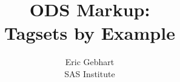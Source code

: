 \documentclass{book}
\begin{document}
\fancyhead{} %
\fancyhead[LO,RE]{\thepage}
\fancyhead[RO]{}
\fancyhead[LE]{}
\fancyfoot[CO,CE]{}

\frontmatter
\title{ODS Markup: \\
Tagsets by Example}
\author{Eric Gebhart\\
SAS Institute}
\renewcommand{\today}{September 22, 2003}
\maketitle

\mainmatter
\cleardoublepage
{}
\fancyhead{} %
\setlength{\headrulewidth}{1pt}
\lhead[\rm\thepage]{\sl\rightmark}
\rhead[\sl\leftmark]{\rm\thepage}

\tableofcontents

\backmatter
\end{document}
